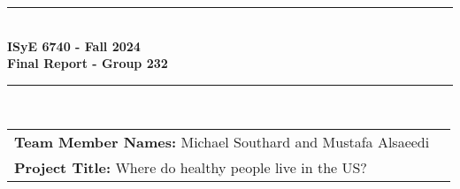 \documentclass{article}
\begin{document}
\clearpage\thispagestyle{empty}
\centering
\vspace{1cm}
    
\rule{\linewidth}{1mm} \\[0.5cm]
{ \Large \bfseries ISyE 6740 - Fall 2024\\[0.2cm]
    Final Report - Group 232}\\[0.5cm]
\rule{\linewidth}{1mm} \\[1cm]

\begin{tabular}{l p{5cm}}
\textbf{Team Member Names:} Michael Southard and Mustafa Alsaeedi &   \\[10pt]
\textbf{Project Title:} Where do healthy people live in the US? &  \\[10pt]
\end{tabular} 
\end{document}
